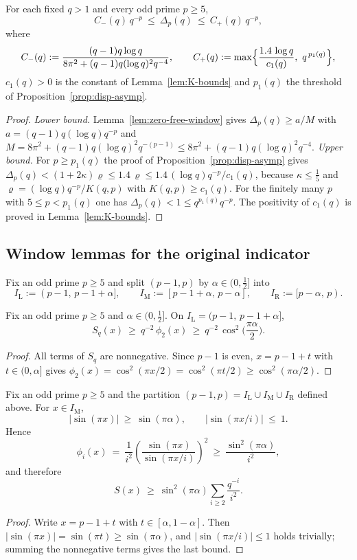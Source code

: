 \begin{corollary}\label{cor:disp-bounds}
For each fixed $q>1$ and every odd prime $p\ge5$,
\[
C_-(q)\,q^{-p}\ \le\ \Delta_p(q)\ \le\ C_+(q)\,q^{-p},
\]
where
\[
C_-(q):=\frac{(q-1)q\log q}{8\pi^2+(q-1)q(\log q)^2q^{-4}},
\qquad
C_+(q):=\max\Bigl\{\frac{1.4\,\log q}{c_1(q)},\ q^{\,p_1(q)}\Bigr\},
\]
$c_1(q)>0$ is the constant of Lemma~\ref{lem:K-bounds} and $p_1(q)$ the threshold of Proposition~\ref{prop:disp-asymp}.
\end{corollary}

\begin{proof}
\emph{Lower bound.} Lemma~\ref{lem:zero-free-window} gives $\Delta_p(q)\ge a/M$ with $a=(q-1)q(\log q)q^{-p}$ and $M=8\pi^2+(q-1)q(\log q)^2q^{-(p-1)}\le8\pi^2+(q-1)q(\log q)^2q^{-4}$.
\emph{Upper bound.} For $p\ge p_1(q)$ the proof of Proposition~\ref{prop:disp-asymp} gives $\Delta_p(q)<(1+2\kappa)\varrho\le1.4\,\varrho\le1.4\,(\log q)q^{-p}/c_1(q)$, because $\kappa\le\frac15$ and $\varrho=(\log q)q^{-p}/K(q,p)$ with $K(q,p)\ge c_1(q)$. For the finitely many $p$ with $5\le p<p_1(q)$ one has $\Delta_p(q)<1\le q^{p_1(q)}q^{-p}$. The positivity of $c_1(q)$ is proved in Lemma~\ref{lem:K-bounds}.
\end{proof}

\subsection{Window lemmas for the original indicator}\label{sec:window-lemmas}
Fix an odd prime $p\ge5$ and split $(p-1,p)$ by $\alpha\in(0,\tfrac12]$ into
\[
I_{\mathrm L}:=(p-1,\,p-1+\alpha],\qquad
I_{\mathrm M}:=[p-1+\alpha,\,p-\alpha],\qquad
I_{\mathrm R}:=[p-\alpha,\,p).
\]

\begin{lemma}[Left-window lower bound via $i=2$]\label{lem:left-only}
Fix an odd prime $p\ge5$ and $\alpha\in(0,\tfrac12]$. On $I_{\mathrm L}=(p-1,\,p-1+\alpha]$,
\[
S_q(x)\ \ge\ q^{-2}\,\phi_2(x)\ \ge\ q^{-2}\,\cos^2\!\Big(\frac{\pi\alpha}{2}\Big).
\]
\end{lemma}
\begin{proof}
All terms of $S_q$ are nonnegative. Since $p-1$ is even, $x=p-1+t$ with $t\in(0,\alpha]$ gives $\phi_2(x)=\cos^2(\pi x/2)=\cos^2(\pi t/2)\ge\cos^2(\pi\alpha/2)$.
\end{proof}

\begin{lemma}\label{lem:left-middle}
Fix an odd prime $p\ge5$ and the partition $(p-1,p)=I_{\mathrm L}\cup I_{\mathrm M}\cup I_{\mathrm R}$ defined above. 
For $x\in I_{\mathrm M}$,
\[
|\sin(\pi x)|\ \ge\ \sin(\pi\alpha),\qquad 
|\sin(\pi x/i)|\ \le\ 1.
\]
Hence
\[
\phi_i(x)\ =\ \frac{1}{i^2}\left(\frac{\sin(\pi x)}{\sin(\pi x/i)}\right)^{\!2}
\ \ge\ \frac{\sin^2(\pi\alpha)}{i^2},
\]
and therefore
\[
S(x)\ \ge\ \sin^2(\pi\alpha)\sum_{i\ge2}\frac{q^{-i}}{i^2}.
\]
\end{lemma}
\begin{proof}
Write $x=p-1+t$ with $t\in[\alpha,1-\alpha]$. Then $|\sin(\pi x)|=\sin(\pi t)\ge\sin(\pi\alpha)$, and $|\sin(\pi x/i)|\le1$ holds trivially; summing the nonnegative terms gives the last bound.
\end{proof}


